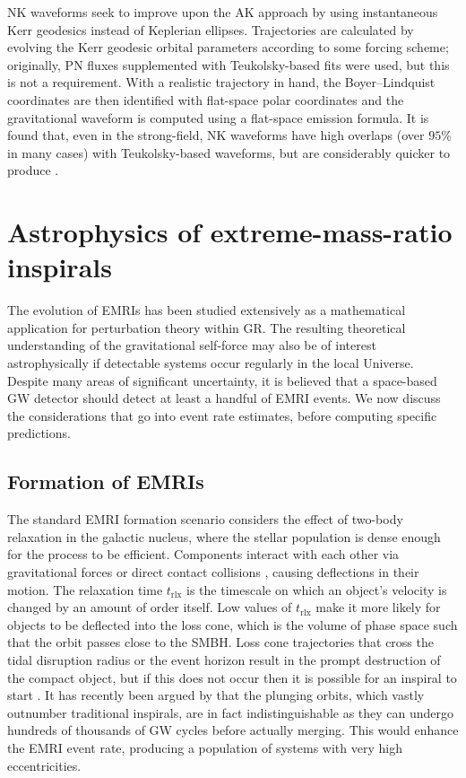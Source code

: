 NK waveforms seek to improve upon the AK approach by using instantaneous Kerr geodesics instead of Keplerian ellipses. Trajectories are calculated by evolving the Kerr geodesic orbital parameters according to some forcing scheme; originally, PN fluxes supplemented with Teukolsky-based fits were used, but this is not a requirement. With a realistic trajectory in hand, the Boyer--Lindquist coordinates are then identified with flat-space polar coordinates and the gravitational waveform is computed using a flat-space emission formula. It is found that, even in the strong-field, NK waveforms have high overlaps (over $95\%$ in many cases) with Teukolsky-based waveforms, but are considerably quicker to produce \citep{babak_kludge_2007}.


\section{Astrophysics of extreme-mass-ratio inspirals}
The evolution of EMRIs has been studied extensively as a mathematical application for perturbation theory within GR. The resulting theoretical understanding of the gravitational self-force may also be of interest astrophysically if detectable systems occur regularly in the local Universe. Despite many areas of significant uncertainty, it is believed that a space-based GW detector should detect at least a handful of EMRI events. We now discuss the considerations that go into event rate estimates, before computing specific predictions.

\subsection{Formation of EMRIs}
The standard EMRI formation scenario considers the effect of two-body relaxation in the galactic nucleus, where the stellar population is dense enough for the process to be efficient. Components interact with each other via gravitational forces or direct contact collisions \citep{freitag_dynamics_2007}, causing deflections in their motion. The relaxation time $t_\mathrm{rlx}$ is the timescale on which an object's velocity is changed by an amount of order itself. Low values of $t_\mathrm{rlx}$ make it more likely for objects to be deflected into the loss cone, which is the volume of phase space such that the orbit passes close to the SMBH. Loss cone trajectories that cross the tidal disruption radius or the event horizon result in the prompt destruction of the compact object, but if this does not occur then it is possible for an inspiral to start \citep{alexander_orbital_2003}. It has recently been argued by \citet{amaro-seoane_role_2013} that the plunging orbits, which vastly outnumber traditional inspirals, are in fact indistinguishable as they can undergo hundreds of thousands of GW cycles before actually merging. This would enhance the EMRI event rate, producing a population of systems with very high eccentricities.

